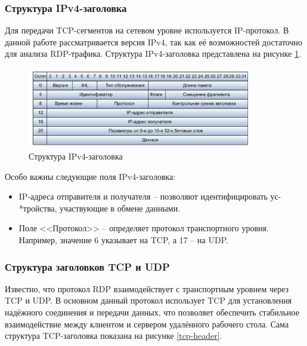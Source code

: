 \documentclass[bachelor, och, coursework]{SCWorks}
\begin{document}
\subsubsection{Структура IPv4-заголовка}

Для передачи TCP-сегментов на сетевом уровне используется IP-протокол. В данной работе рассматривается версия IPv4, 
так как её возможностей достаточно для анализа RDP-трафика. Структура IPv4-заголовка представлена на рисунке \ref{ipv4-header}.

\begin{figure}[H]
  \centering
  \includegraphics[width=0.9\textwidth]{pics/ipv4-header.png}
  \caption{Структура IPv4-заголовка}
  \label{ipv4-header}
\end{figure}

Особо важны следующие поля IPv4-заголовка:

\begin{itemize}
  \item IP-адреса отправителя и получателя -- позволяют идентифицировать ус-\\*тройства, участвующие в обмене данными.
  \item Поле <<Протокол>> -- определяет протокол транспортного уровня. Например, значение 6 указывает на TCP, а 17 -- на UDP.
\end{itemize}

\subsubsection{Структура заголовков TCP и UDP}

Известно, что протокол RDP взаимодействует с транспортным уровнем через TCP и UDP.
В основном данный протокол использует TCP для установления надёжного соединения и передачи данных, что позволяет обеспечить стабильное взаимодействие 
между клиентом и сервером удалённого рабочего стола. Сама структура TCP-заголовка показана на рисунке \ref{tcp-header}.
\end{document}
